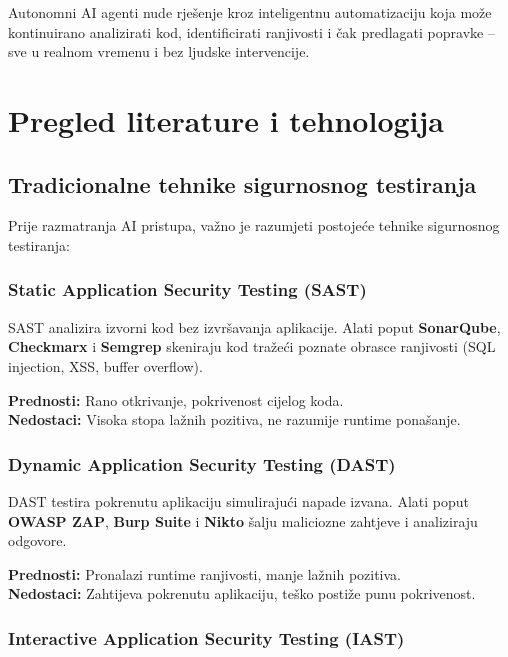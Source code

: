\documentclass[12pt,a4paper]{article}
\begin{document}
Autonomni AI agenti nude rješenje kroz inteligentnu automatizaciju koja može kontinuirano analizirati kod, identificirati ranjivosti i čak predlagati popravke -- sve u realnom vremenu i bez ljudske intervencije.

\section{Pregled literature i tehnologija}

\subsection{Tradicionalne tehnike sigurnosnog testiranja}

Prije razmatranja AI pristupa, važno je razumjeti postojeće tehnike sigurnosnog testiranja:

\subsubsection{Static Application Security Testing (SAST)}

SAST analizira izvorni kod bez izvršavanja aplikacije. Alati poput \textbf{SonarQube}, \textbf{Checkmarx} i \textbf{Semgrep} skeniraju kod tražeći poznate obrasce ranjivosti (SQL injection, XSS, buffer overflow).

\textbf{Prednosti:} Rano otkrivanje, pokrivenost cijelog koda.\\
\textbf{Nedostaci:} Visoka stopa lažnih pozitiva, ne razumije runtime ponašanje.

\subsubsection{Dynamic Application Security Testing (DAST)}

DAST testira pokrenutu aplikaciju simulirajući napade izvana. Alati poput \textbf{OWASP ZAP}, \textbf{Burp Suite} i \textbf{Nikto} šalju maliciozne zahtjeve i analiziraju odgovore.

\textbf{Prednosti:} Pronalazi runtime ranjivosti, manje lažnih pozitiva.\\
\textbf{Nedostaci:} Zahtijeva pokrenutu aplikaciju, teško postiže punu pokrivenost.

\subsubsection{Interactive Application Security Testing (IAST)}
\end{document}
